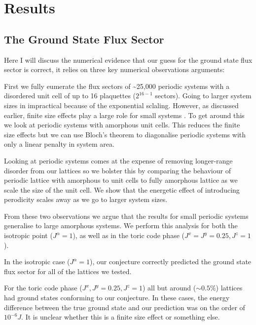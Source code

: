 \hypertarget{results}{%
\section{Results}\label{results}}

\hypertarget{the-ground-state-flux-sector}{%
\subsection{The Ground State Flux
Sector}\label{the-ground-state-flux-sector}}

Here I will discuss the numerical evidence that our guess for the ground
state flux sector is correct, it relies on three key numerical
observations arguments:

First we fully eumerate the flux sectors of \textasciitilde25,000
periodic systems with a disordered unit cell of up to 16 plaquettes
(\(2^{16-1}\) sectors). Going to larger system sizes in impractical
because of the exponential sclaling. However, as discussed earlier,
finite size effects play a large role for small systems
\autocite{kitaevAnyonsExactlySolved2006}. To get around this we look at
periodic systems with amorphous unit cells. This reduces the finite size
effects but we can use Bloch's theorem to diagonalise periodic systems
with only a linear penalty in system area.

Looking at periodic systems comes at the expense of removing
longer-range disorder from our lattices so we bolster this by comparing
the behaviour of periodic lattice with amorphous to unit cells to fully
amorphous lattice as we scale the size of the unit cell. We show that
the energetic effect of introducing perodicity scales away as we go to
larger system sizes.

From these two observations we argue that the results for small periodic
systems generalise to large amorphous systems. We perform this analysis
for both the isotropic point (\(J^\alpha = 1\)), as well as in the toric
code phase (\(J^x = J^y = 0.25, J^z = 1\)).

In the isotropic case (\(J^\alpha = 1\)), our conjecture correctly
predicted the ground state flux sector for all of the lattices we
tested.

For the toric code phase (\(J^x, J^y = 0.25, J^z = 1\)) all but around
(\(\sim 0.5 \%\)) lattices had ground states conforming to our
conjecture. In these cases, the energy difference between the true
ground state and our prediction was on the order of \(10^{-6} J\). It is
unclear whether this is a finite size effect or something else.

